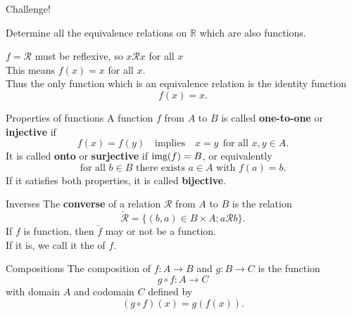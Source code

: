 \documentclass{beamer}
\begin{document}
\begin{frame}{Challenge!}
\begin{prob}
Determine all the equivalence relations on $\mathbb{R}$ which are also functions.
\end{prob}
\pause
\begin{soln}
$f=\mathcal R$ must be reflexive, so $x\mathcal Rx$ for all $x$\\
\pause
This means $f(x) = x$ for all $x$.\\
\pause
Thus the only function which is an equivalence relation is the identity function
$$f(x) = x.$$
\end{soln}
\end{frame}

\begin{frame}{Properties of functions}
A function $f$ from $A$ to $B$ is called \textbf{one-to-one} or \textbf{injective} if 
\pause
$$f(x) = f(y) \quad\text{implies}\quad x=y\ \ \text{for all $x,y\in A$}.$$
\pause
It is called \textbf{onto} or \textbf{surjective} if $\textnormal{img}(f) = B$, or equivalently
$$\text{for all $b\in B$ there exists $a\in A$ with $f(a) =b$}.$$
\pause
If it satisfies both properties, it is called \textbf{bijective}.
\end{frame}

\begin{frame}{Inverses}
The \textbf{converse} of a relation $\mathcal R$ from $A$ to $B$ is the relation
\pause
$$\check{\mathcal R} = \{(b,a)\in B\times A: a\mathcal R b\}.$$
\pause
If $f$ is  function, then $\check f$ may or not be a function.\\
\pause
If it is, we call it the  of $f$.
\end{frame}

\begin{frame}{Compositions}
The composition of $f: A\rightarrow B$ and $g: B\rightarrow C$ is the function
\pause
$$g\circ f: A\rightarrow C$$
\pause
with domain $A$ and codomain $C$ defined by
\pause
$$(g\circ f)(x)  = g(f(x)).$$
\end{frame}
\end{document}
